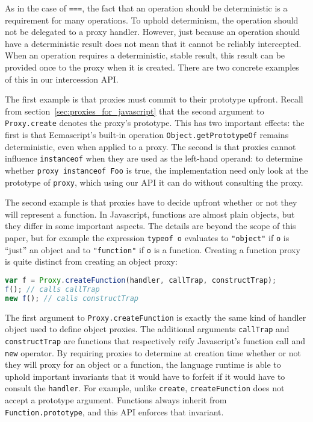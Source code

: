 \documentclass{acm_proc_article-sp}
\begin{document}
As in the case of \texttt{===}, the fact that an operation should be deterministic is a requirement for many operations. To uphold determinism, the operation should not be delegated to a proxy handler. However, just because an operation should have a deterministic result does not mean that it cannot be reliably intercepted. When an operation requires a deterministic, stable result, this result can be provided once to the proxy when it is created. There are two concrete examples of this in our intercession API.

The first example is that proxies must commit to their prototype upfront. Recall from section~\ref{sec:proxies_for_javascript} that the second argument to \texttt{Proxy.create} denotes the proxy's prototype. This has two important effects: the first is that Ecmascript's built-in operation \texttt{Object.getPrototypeOf} remains deterministic, even when applied to a proxy. The second is that proxies cannot influence \texttt{instanceof} when they are used as the left-hand operand: to determine whether \texttt{proxy instanceof Foo} is true, the implementation need only look at the prototype of \texttt{proxy}, which using our API it can do without consulting the proxy.

The second example is that proxies have to decide upfront whether or not they will represent a function. In Javascript, functions are almost plain objects, but they differ in some important aspects. The details are beyond the scope of this paper, but for example the expression \texttt{typeof o} evaluates to \texttt{"object"} if \texttt{o} is ``just'' an object and to \texttt{"function"} if \texttt{o} is a function. Creating a function proxy is quite distinct from creating an object proxy:

\begin{lstlisting}[language=javascript]
var f = Proxy.createFunction(handler, callTrap, constructTrap);
f(); // calls callTrap
new f(); // calls constructTrap
\end{lstlisting}

The first argument to \texttt{Proxy.createFunction} is exactly the same kind of handler object used to define object proxies. The additional arguments \texttt{callTrap} and \texttt{constructTrap} are functions that respectively reify Javascript's function call and \texttt{new} operator. By requiring proxies to determine at creation time whether or not they will proxy for an object or a function, the language runtime is able to uphold important invariants that it would have to forfeit if it would have to consult the \texttt{handler}. For example, unlike \texttt{create}, \texttt{createFunction} does not accept a prototype argument. Functions always inherit from \texttt{Function.prototype}, and this API enforces that invariant.
\end{document}
